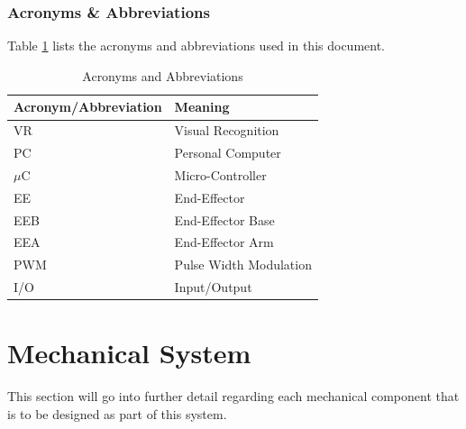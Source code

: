\documentclass[titlepage]{article}
\begin{document}
\subsubsection{Acronyms \& Abbreviations}
Table \ref{tab:Acronyms} lists the acronyms and abbreviations used in this document.
\begin{table}[h!]
\centering
\caption{Acronyms and Abbreviations}
\begin{tabular}{| p{6cm} | p{6cm} |}\hline
	\textbf{Acronym/Abbreviation}	&\textbf{Meaning}\\\hline
	VR								&Visual Recognition\\\hline
	PC								&Personal Computer\\\hline
	$\mu$C							&Micro-Controller\\\hline
	EE								&End-Effector\\\hline
	EEB								&End-Effector Base\\\hline
	EEA								&End-Effector Arm\\\hline
	PWM								&Pulse Width Modulation\\\hline
	I/O								&Input/Output\\\hline
\end{tabular}
\label{tab:Acronyms}
\end{table}
\newpage






\section{Mechanical System}
This section will go into further detail regarding each mechanical component that is to be designed as part of this system.

\end{document}
